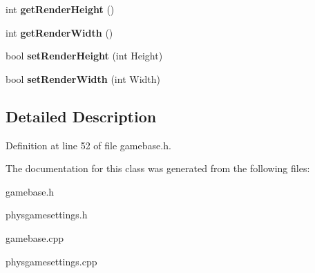 \begin{DoxyCompactItemize}
\item 
\hypertarget{classSettings_a0d620300e6eb872e6914cabad3035641}{
int {\bfseries getRenderHeight} ()}
\label{df/d9a/classSettings_a0d620300e6eb872e6914cabad3035641}

\item 
\hypertarget{classSettings_aea6ac481630cf986acf3853939c6bdf3}{
int {\bfseries getRenderWidth} ()}
\label{df/d9a/classSettings_aea6ac481630cf986acf3853939c6bdf3}

\item 
\hypertarget{classSettings_a0381303bcccf944c77b8f88dcb4ffa96}{
bool {\bfseries setRenderHeight} (int Height)}
\label{df/d9a/classSettings_a0381303bcccf944c77b8f88dcb4ffa96}

\item 
\hypertarget{classSettings_abb497fd25c4184054c1bb89a7e58b5d3}{
bool {\bfseries setRenderWidth} (int Width)}
\label{df/d9a/classSettings_abb497fd25c4184054c1bb89a7e58b5d3}

\end{DoxyCompactItemize}


\subsection{Detailed Description}


Definition at line 52 of file gamebase.h.

The documentation for this class was generated from the following files:\begin{DoxyCompactItemize}
\item 
gamebase.h\item 
physgamesettings.h\item 
gamebase.cpp\item 
physgamesettings.cpp\end{DoxyCompactItemize}
